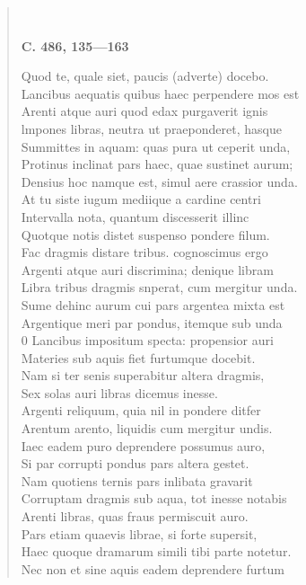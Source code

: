 \documentclass[11pt, a4paper]{report}
\begin{document}
\begin{verse}
        ﻿\pagebreak 
    \begin{center} \textbf{C. 486, 135—163} \end{center} \marginpar{[35]} Quod te, quale siet, paucis (adverte) docebo. \\ Lancibus aequatis quibus haec perpendere mos est \\ Arenti atque auri quod edax purgaverit ignis \\ lmpones libras, neutra ut praeponderet, hasque \\ Summittes in aquam: quas pura ut ceperit unda, \\ Protinus inclinat pars haec, quae sustinet aurum; \\ Densius hoc namque est, simul aere crassior unda. \\ At tu siste iugum mediique a cardine centri \\ Intervalla nota, quantum discesserit illinc \\ Quotque notis distet suspenso pondere filum. \\ Fac dragmis distare tribus. cognoscimus ergo \\ Argenti atque auri discrimina; denique libram \\ Libra tribus dragmis snperat, cum mergitur unda. \\ Sume dehinc aurum cui pars argentea mixta est \\ Argentique meri par pondus, itemque sub unda \\ 0 Lancibus impositum specta: propensior auri \\ Materies sub aquis fiet furtumque docebit. \\ Nam si ter senis superabitur altera dragmis, \\ Sex solas auri libras dicemus inesse. \\ Argenti reliquum, quia nil in pondere ditfer \\ Arentum arento, liquidis cum mergitur undis. \\ Iaec eadem puro deprendere possumus auro, \\ Si par corrupti pondus pars altera gestet. \\ Nam quotiens ternis pars inlibata gravarit \\ Corruptam dragmis sub aqua, tot inesse notabis \\ Arenti libras, quas fraus permiscuit auro. \\ Pars etiam quaevis librae, si forte supersit, \\ Haec quoque dramarum simili tibi parte notetur. \\ Nec non et sine aquis eadem deprendere furtum \\ 

\end{verse}
\end{document}
